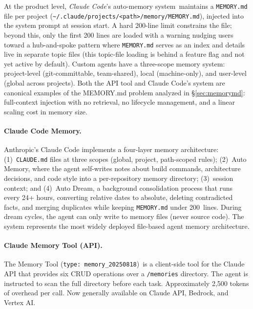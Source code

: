 At the product level, \emph{Claude Code}'s auto-memory
system~\cite{gurgone2026claudememory}\evV maintains a
\texttt{MEMORY.md} file per project
(\texttt{\~{}/.claude/\allowbreak{}projects/\allowbreak{}<path>/\allowbreak{}memory/\allowbreak{}MEMORY.md}), injected into
the system prompt at session start. A hard 200-line limit constrains
the file\evS; beyond this, only the first 200 lines are loaded with a
warning nudging users toward a hub-and-spoke pattern where
\texttt{MEMORY.md} serves as an index and details live in separate
topic files (this topic-file loading is behind a feature flag and not
yet active by default)\evS. Custom agents have a three-scope memory
system: project-level (git-committable, team-shared), local
(machine-only), and user-level (global across projects)\evS. Both the
API tool and Claude Code's system are canonical examples of the
MEMORY.md problem analyzed in \S\ref{sec:memorymd}: full-context
injection with no retrieval, no lifecycle management, and a linear
scaling cost in memory size.

\paragraph{Claude Code Memory.}
Anthropic's Claude Code implements a four-layer memory
architecture\evD: (1)~\texttt{CLAUDE.md} files at three scopes (global,
project, path-scoped rules); (2)~Auto Memory, where the agent
self-writes notes about build commands, architecture decisions, and code
style into a per-repository memory directory; (3)~session context;
and (4)~Auto Dream, a background consolidation process that runs every
24+ hours, converting relative dates to absolute, deleting contradicted
facts, and merging duplicates while keeping \texttt{MEMORY.md} under
200~lines. During dream cycles, the agent can only write to memory
files (never source code). The system represents the most widely
deployed file-based agent memory architecture.

\paragraph{Claude Memory Tool (API).}
The Memory Tool (\texttt{type: memory\_20250818})\evD\ is a client-side
tool for the Claude API that provides six CRUD operations over a
\texttt{/memories} directory. The agent is instructed to scan the full
directory before each task. Approximately 2{,}500 tokens of overhead per
call. Now generally available on Claude API, Bedrock, and Vertex AI.

